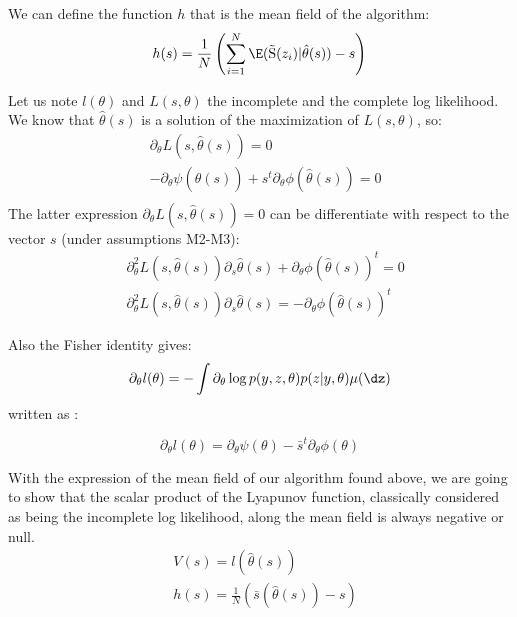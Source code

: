 \documentclass[a4paper]{article}
\theoremstyle{plain}
\DeclareMathOperator*{\St}{\tilde{S}}
\theoremstyle{plain}
\theoremstyle{definition}
\begin{document}
\begin{appendices}
We can define the function $h$ that is the mean field of the algorithm:
\begin{equation}
h(s) = \frac{1}{N}\left(\sum_{i=1}^{N}{\E(\St(z_i)|\hat{\theta}(s))}-s \right)
\end{equation}

Let us note $l(\theta)$ and $L(s,\theta)$ the incomplete and the complete log likelihood.\\
We know that $\hat{\theta}(s)$ is a solution of the maximization of $L(s,\theta)$, so:
\begin{equation}
\begin{split}
&\partial_{\theta}L(s,\hat{\theta}(s)) = 0\\
&-\partial_{\theta}\psi(\hat{\theta}(s)) +s^t \partial_{\theta}\phi(\hat{\theta}(s)) = 0\\
\end{split}
\end{equation}
The latter expression $\partial_{\theta}L(s,\hat{\theta}(s)) = 0 $ can be differentiate with respect to the vector $s$ (under assumptions M2-M3):
\begin{equation}
\begin{split} 
& \partial^2_{\theta}L(s,\hat{\theta}(s))\partial_{s}\hat{\theta}(s) + \partial_{\theta}\phi(\hat{\theta}(s))^t = 0\\
& \partial^2_{\theta}L(s,\hat{\theta}(s))\partial_{s}\hat{\theta}(s) = -\partial_{\theta}\phi(\hat{\theta}(s))^t
\end{split}
\end{equation}

Also the Fisher identity gives:
\begin{equation}
\partial_{\theta} l(\theta) = -\int \partial_{\theta} \log p(y,z,\theta) p(z|y,\theta) \mu(\dz)
\end{equation}
written as :

\begin{equation}
\partial_{\theta} l(\theta) = \partial_{\theta}\psi(\theta) -\bar{s}^t\partial_{\theta}\phi(\theta)
\end{equation}

With the expression of the mean field of our algorithm found above, we are going to show that the scalar product of the Lyapunov function, classically considered as being the incomplete log likelihood, along the mean field is always negative or null. 
\begin{equation}
\begin{split}
& V(s) = l(\hat{\theta}(s))\\
& h(s) = \frac{1}{N}(\bar{s}(\hat{\theta}(s)) - s)
\end{split}
\end{equation}


\end{appendices}
\end{document}

